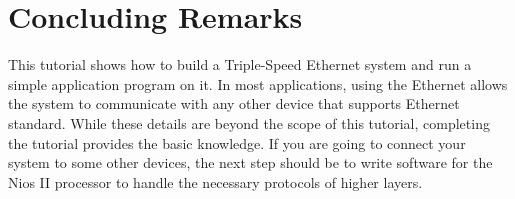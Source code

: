 \documentclass[11pt, twoside, pdftex]{article}
\newcommand{\commonPath}{../../../Common}
\begin{document}
\newpage
\section{Concluding Remarks}
This tutorial shows how to build a Triple-Speed Ethernet system and run a simple application program on it. In most applications, using the Ethernet allows the system to communicate with any other device that supports Ethernet standard. While these details are beyond the scope of this tutorial, completing the tutorial provides the basic knowledge. If you are going to connect your system to some other devices, the next step should be to write software for the Nios II processor to handle the necessary protocols of higher layers.




\end{document}
